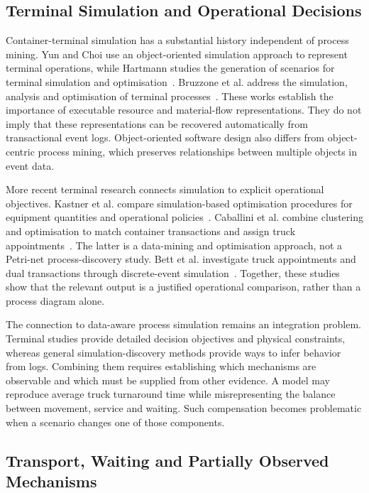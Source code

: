\subsection{Terminal Simulation and Operational Decisions}

Container-terminal simulation has a substantial history independent of process mining. Yun and Choi use an object-oriented simulation approach to represent terminal operations, while Hartmann studies the generation of scenarios for terminal simulation and optimisation~\cite{YUN1999DESSimulation,Hartmann2005cenariosforCTSimulation}. Bruzzone et al. address the simulation, analysis and optimisation of terminal processes~\cite{Bruzzone2012}. These works establish the importance of executable resource and material-flow representations. They do not imply that these representations can be recovered automatically from transactional event logs. Object-oriented software design also differs from object-centric process mining, which preserves relationships between multiple objects in event data.

More recent terminal research connects simulation to explicit operational objectives. Kastner et al. compare simulation-based optimisation procedures for equipment quantities and operational policies~\cite{Kastner2021}. Caballini et al. combine clustering and optimisation to match container transactions and assign truck appointments~\cite{CTprocessMiningTAS2020}. The latter is a data-mining and optimisation approach, not a Petri-net process-discovery study. Bett et al. investigate truck appointments and dual transactions through discrete-event simulation~\cite{Bett2024}. Together, these studies show that the relevant output is a justified operational comparison, rather than a process diagram alone.

The connection to data-aware process simulation remains an integration problem. Terminal studies provide detailed decision objectives and physical constraints, whereas general simulation-discovery methods provide ways to infer behavior from logs. Combining them requires establishing which mechanisms are observable and which must be supplied from other evidence. A model may reproduce average truck turnaround time while misrepresenting the balance between movement, service and waiting. Such compensation becomes problematic when a scenario changes one of those components.

\subsection{Transport, Waiting and Partially Observed Mechanisms}

